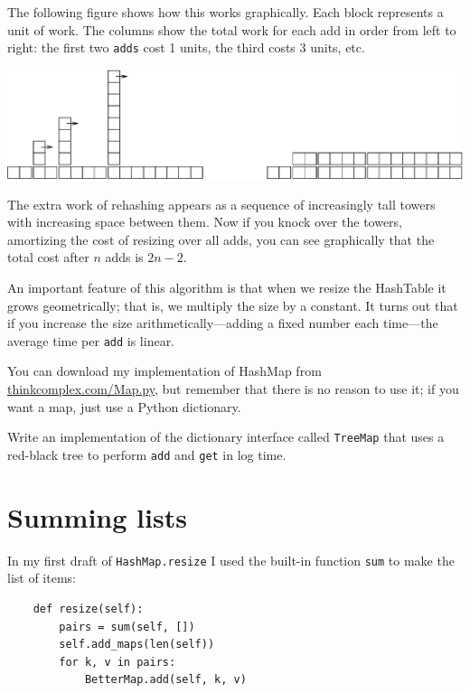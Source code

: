 \documentclass[10pt]{book}
\begin{document}
The following figure shows how this works graphically.  Each
block represents a unit of work.  The columns show the total
work for each add in order from left to right: the first two
{\tt adds} cost 1 units, the third costs 3 units, etc.

\beforefig
\centerline{\includegraphics[width=5.5in]{figs/towers.eps}}
\afterfig

The extra work of rehashing appears as a sequence of increasingly
tall towers with increasing space between them.  Now if you knock
over the towers, amortizing the cost of resizing over all
adds, you can see graphically that the total cost after $n$
adds is $2n - 2$.

An important feature of this algorithm is that when we resize the
HashTable it grows geometrically; that is, we multiply the size by a
constant.  It turns out that if you increase the size
arithmetically---adding a fixed number each time---the average time
per {\tt add} is linear.

You can download my implementation of HashMap from
\url{thinkcomplex.com/Map.py}, but remember that there 
is no reason to use it; if you want a map, just use a Python dictionary.

\begin{ex}

Write an implementation of the dictionary interface called
{\tt TreeMap} that uses a red-black tree to perform {\tt add}
and {\tt get} in log time.

\end{ex}



\section{Summing lists}

In my first draft of {\tt HashMap.resize} I used the built-in function
{\tt sum} to make the list of items:

\begin{verbatim}
    def resize(self):
        pairs = sum(self, [])
        self.add_maps(len(self))
        for k, v in pairs:
            BetterMap.add(self, k, v)
\end{verbatim}
\end{document}
